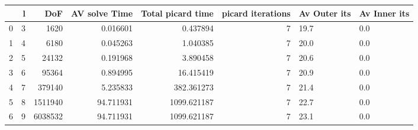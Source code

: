 \begin{tabular}{lrrrrrll}
\toprule
{} &  l &      DoF &  AV solve Time &  Total picard time &  picard iterations & Av Outer its & Av Inner its \\
\midrule
0 &  3 &     1620 &       0.016601 &           0.437894 &                  7 &         19.7 &          0.0 \\
1 &  4 &     6180 &       0.045263 &           1.040385 &                  7 &         20.0 &          0.0 \\
2 &  5 &    24132 &       0.191968 &           3.890458 &                  7 &         20.6 &          0.0 \\
3 &  6 &    95364 &       0.894995 &          16.415419 &                  7 &         20.9 &          0.0 \\
4 &  7 &   379140 &       5.235833 &         382.361273 &                  7 &         21.4 &          0.0 \\
5 &  8 &  1511940 &      94.711931 &        1099.621187 &                  7 &         22.7 &          0.0 \\
6 &  9 &  6038532 &      94.711931 &        1099.621187 &                  7 &         23.1 &          0.0 \\
\bottomrule
\end{tabular}
